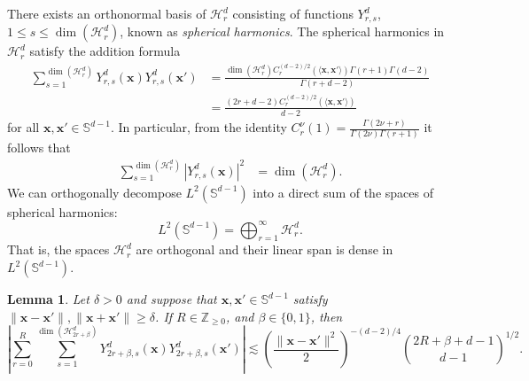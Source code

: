 \documentclass{article}
\newtheorem{lemma}[theorem]{Lemma}
\theoremstyle{definition}
\newcommand{\mc}{\mathcal}
\renewcommand{\S}{\mathbb{S}}
\def\vx{{\bm{x}}}
\begin{document}
There exists an orthonormal basis of $\mc{H}_r^d$ consisting of functions $Y_{r,s}^d$, $1 \leq s \leq \dim(\mc{H}_r^d)$, known as \emph{spherical harmonics}. 
The spherical harmonics in $\mc{H}_r^d$ satisfy the addition formula
\begin{align}\label{eqn:addition-formula}
    \sum_{s = 1}^{\dim(\mc{H}_r^d)} Y_{r,s}^d(\vx) Y_{r, s}^d(\vx') &= \frac{\dim(\mc{H}_r^d)C_r^{(d-2)/2}(\langle \vx, \vx' \rangle)\Gamma(r + 1)\Gamma(d - 2) }{\Gamma(r + d - 2)}\nonumber\\
    &= \frac{(2r + d - 2)C_r^{(d - 2)/2}(\langle \vx, \vx' \rangle) }{d - 2}
\end{align}
for all $\vx, \vx' \in \S^{d-1}$. In particular, from the identity $C_r^{\nu}(1) = \frac{\Gamma(2\nu + r) }{\Gamma(2\nu)\Gamma(r + 1)}$ it follows that
\begin{align*}
    \sum_{s = 1}^{\dim(\mc{H}_r^d) }|Y_{r, s}^d(\vx)|^2 &= \dim(\mc{H}_r^d).
\end{align*}
We can orthogonally decompose $L^2(\S^{d - 1})$ into a direct sum of the spaces of spherical harmonics:
\[L^2(\S^{d - 1}) = \bigoplus_{r = 1}^{\infty} \mc{H}_r^d. \]
That is, the spaces $\mc{H}_r^d$ are orthogonal and their linear span is dense in $L^2(\S^{d - 1})$.
\begin{lemma}\label{lemma:addition-formula-bound}
    Let $\delta > 0$ and suppose that $\vx, \vx' \in \S^{d - 1}$ satisfy $\|\vx - \vx'\|, \|\vx + \vx'\| \geq \delta$. If $R \in \mathbb{Z}_{\geq 0}$, and $\beta \in \{0, 1\}$, then
    \[\left|\sum_{r = 0}^R \sum_{s= 1}^{\dim(\mc{H}_{2r + \beta}^d) }Y_{2r + \beta, s}^d(\vx) Y_{2r + \beta, s}^d(\vx')\right| \lesssim \left(\frac{\|\vx - \vx'\|^2}{2} \right)^{-(d-2)/4 } \binom{2R + \beta + d - 1}{d - 1}^{1/2}. \]
\end{lemma}
\end{document}
